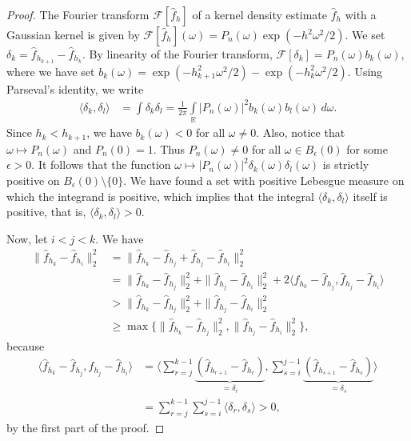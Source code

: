 \begin{proof}
    The Fourier transform $\mathcal{F}[\hat{f}_h]$ of a kernel density estimate $\hat{f}_h$ with a Gaussian kernel is given by $\mathcal{F}[\hat{f}_h](\omega)=P_n(\omega)\exp{(-h^2\omega^2/2)}$. We set $\delta_k=\hat{f}_{h_{k+1}}-\hat{f}_{h_k}$. By linearity of the Fourier transform, $\mathcal{F}[\delta_k]=P_n(\omega)b_k(\omega)$, where we have set $b_k(\omega)=\exp{(-h_{k+1}^2\omega^2/2)}-\exp{(-h_k^2\omega^2/2)}$. Using Parseval's identity, we write
    \begin{align*}
        \langle\delta_k,\delta_l\rangle&=\int\delta_k\delta_l=\frac{1}{2\pi}\int\limits_{\mathbb{R}}|P_n(\omega)|^2b_k(\omega)b_l(\omega)\,d\omega.
    \end{align*}
    Since $h_k<h_{k+1}$, we have $b_k(\omega)<0$ for all $\omega\ne0$. Also, notice that $\omega\mapsto P_n(\omega)$ and $P_n(0)=1$. Thus $P_n(\omega)\ne0$ for all $\omega\in B_{\epsilon}(0)$ for some $\epsilon>0$. It follows that the function $\omega\mapsto|P_n(\omega)|^2\delta_k(\omega)\delta_l(\omega)$ is strictly positive on $B_{\epsilon}(0)\setminus\{0\}$. We have found a set with positive Lebesgue measure on which the integrand is positive, which implies that the integral $\langle\delta_k,\delta_l\rangle$ itself is positive, that is, $\langle\delta_k,\delta_l\rangle>0$.

    Now, let $i<j<k$. We have
    \begin{align*}
        \|\hat{f}_{h_k}-\hat{f}_{h_i}\|_2^2&=\|\hat{f}_{h_k}-\hat{f}_{h_j}+\hat{f}_{h_j}-\hat{f}_{h_i}\|_2^2\\&=\|\hat{f}_{h_k}-\hat{f}_{h_j}\|_2^2+\|\hat{f}_{h_j}-\hat{f}_{h_i}\|_2^2+2\langle\hat{f}_{h_k}-\hat{f}_{h_j},\hat{f}_{h_j}-\hat{f}_{h_i}\rangle\\&
        >\|\hat{f}_{h_k}-\hat{f}_{h_j}\|_2^2+\|\hat{f}_{h_j}-\hat{f}_{h_i}\|_2^2\\&
        \ge\max\{\|\hat{f}_{h_k}-\hat{f}_{h_j}\|_2^2,\|\hat{f}_{h_j}-\hat{f}_{h_i}\|_2^2\},
    \end{align*}
    because
    \begin{align*}
        \langle\hat{f}_{h_k}-\hat{f}_{h_j},\hat{f}_{h_j}-\hat{f}_{h_i}\rangle&=\langle\sum_{r=j}^{k-1}\underbrace{(\hat{f}_{h_{r+1}}-\hat{f}_{h_r})}_{=\delta_r},\sum_{s=i}^{j-1}\underbrace{(\hat{f}_{h_{s+1}}-\hat{f}_{h_s})}_{=\delta_s}\rangle\\&=\sum_{r=j}^{k-1}\sum_{s=i}^{j-1}\langle\delta_r,\delta_s\rangle>0,
    \end{align*}
     by the first part of the proof.
\end{proof}

